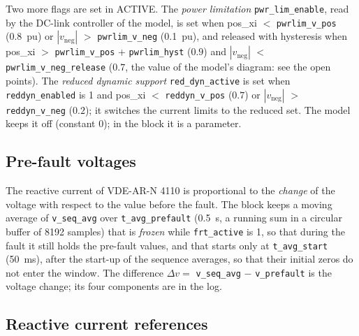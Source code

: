 \documentclass[11pt,a4paper]{scrartcl}
\newcommand{\ped}[1]{_{\mathrm{#1}}}
\newcommand{\code}[1]{\texttt{#1}}
\begin{document}
\begin{onehalfspace}
Two more flags are set in ACTIVE. The \emph{power limitation} \code{pwr\_lim\_enable}, read by the DC-link controller of the model, is set when pos\_xi $<$ \code{pwrlim\_v\_pos} (\SI{0.8}{pu}) or $|v\ped{neg}|$ $>$ \code{pwrlim\_v\_neg} (\SI{0.1}{pu}), and released with hysteresis when pos\_xi $>$ \code{pwrlim\_v\_pos} + \code{pwrlim\_hyst} ($0.9$) and $|v\ped{neg}|$ $<$ \code{pwrlim\_v\_neg\_release} ($0.7$, the value of the model's diagram: see the open points). The \emph{reduced dynamic support} \code{red\_dyn\_active} is set when \code{reddyn\_enabled} is 1 and pos\_xi $<$ \code{reddyn\_v\_pos} ($0.7$) or $|v\ped{neg}|$ $>$ \code{reddyn\_v\_neg} ($0.2$); it switches the current limits to the reduced set. The model keeps it off (constant 0); in the block it is a parameter.

\subsection{Pre-fault voltages}

The reactive current of VDE-AR-N 4110 \cite{vde4110} is proportional to the \emph{change} of the voltage with respect to the value before the fault. The block keeps a moving average of \code{v\_seq\_avg} over \code{t\_avg\_prefault} (\SI{0.5}{\second}, a running sum in a circular buffer of 8192 samples) that is \emph{frozen} while \code{frt\_active} is 1, so that during the fault it still holds the pre-fault values, and that starts only at \code{t\_avg\_start} (\SI{50}{\milli\second}), after the start-up of the sequence averages, so that their initial zeros do not enter the window. The difference $\Delta v = $ \code{v\_seq\_avg} $-$ \code{v\_prefault} is the voltage change; its four components are in the log.

\subsection{Reactive current references}
\label{sec:frt_ref}


\end{onehalfspace}
\end{document}
